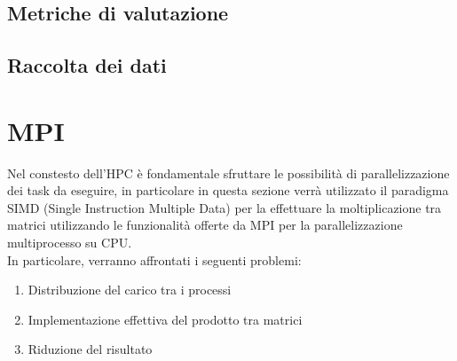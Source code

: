 \documentclass[conference]{IEEEtran}
\begin{document}
\subsection{Metriche di valutazione}
\subsection{Raccolta dei dati}
\section{MPI}
Nel constesto dell'HPC è fondamentale sfruttare le possibilità di parallelizzazione dei task da eseguire, in particolare in questa sezione verrà utilizzato il paradigma SIMD (Single Instruction Multiple Data) per la effettuare la moltiplicazione tra matrici utilizzando le funzionalità offerte da MPI per la parallelizzazione multiprocesso su CPU.\\ In particolare, verranno affrontati i seguenti problemi:
\begin{enumerate}
    \item Distribuzione del carico tra i processi
    \item Implementazione effettiva del prodotto tra matrici
    \item Riduzione del risultato
\end{enumerate}
\end{document}
